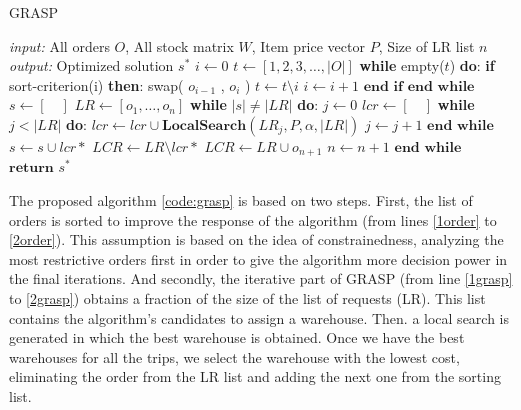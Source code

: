 \documentclass[letterpaper]{article} %
\begin{document}
\begin{algorithm}[H]
    \caption{GRASP}
    \label{alg:GRASP}
    \begin{algorithmic}[1] \label{code:grasp}
        \STATE \textit{input: } All orders $O$, All stock matrix $W$, Item price vector $P$, Size of LR list $n$
        \STATE \textit{output: } Optimized solution $s^*$
        \STATE $i \longleftarrow 0 $
        \STATE $ t \longleftarrow [1,2,3,\dots,|O|]$
        \STATE \textbf{while} empty($t$) \textbf{do}: \label{1order}
        \STATE \quad \textbf{if} sort-criterion(i) \textbf{then}: \label{sort-criterion}
        \STATE \quad \quad swap( $ o_{i-1}$ , $ o_{i} $ )
        \STATE \quad \quad $t \longleftarrow t \setminus i$
        \STATE \quad \quad $i \longleftarrow i + 1$
        \STATE \quad $\textbf{end if}$
        \STATE $\textbf{end while}$ \label{2order}
        \STATE
        \STATE $s \longleftarrow [\quad] $
        \STATE $LR \longleftarrow [o_1,\dots,o_n]$
        \STATE \textbf{while } $|s| \neq |LR|$ \textbf{do}:\label{1grasp}
        \STATE \quad $j \longleftarrow 0 $
        \STATE \quad $lcr \longleftarrow [\quad]$
        \STATE \quad \textbf{while } $j < |LR|$ \textbf{do}:
        \STATE \quad \quad $lcr \longleftarrow lcr \cup \textbf{LocalSearch}(LR_j,P,\alpha,|LR|)$
        \STATE \quad \quad $j \longleftarrow j + 1$
        \STATE \quad $\textbf{end while}$
        \STATE \quad $s \longleftarrow s \cup lcr*$
        \STATE \quad $LCR \longleftarrow LR \setminus lcr*$
        \STATE \quad $LCR \longleftarrow LR \cup  o_{n+1} $
        \STATE \quad $n \longleftarrow n +  1 $
        \STATE $\textbf{end while}$\label{2grasp}
        \STATE $\textbf{return } s^*$
    \end{algorithmic}
\end{algorithm}


The proposed algorithm \ref{code:grasp} is based on two steps. First, the list of orders is sorted to improve the response of the algorithm (from lines \ref{1order} to \ref{2order}). This assumption is based on the idea of constrainedness, analyzing the most restrictive orders first in order to give the algorithm more decision power in the final iterations. And secondly, the iterative part of GRASP (from line \ref{1grasp} to \ref{2grasp}) obtains a fraction of the size of the list of requests (LR). This list contains the algorithm's candidates to assign a warehouse. Then. a local search is generated in which the best warehouse is obtained. Once we have the best warehouses for all the trips, we select the warehouse with the lowest cost, eliminating the order from the LR list and adding the next one from the sorting list.
\end{document}
